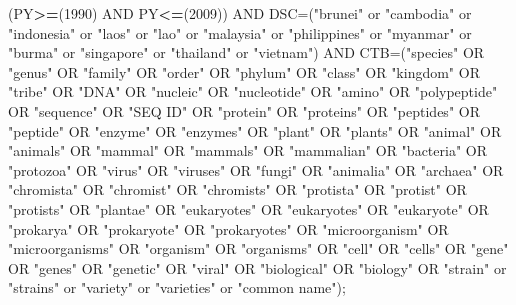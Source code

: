 \documentclass[]{book}
\newenvironment{Shaded}{\begin{snugshade}}{\end{snugshade}}
\newcommand{\DecValTok}[1]{\textcolor[rgb]{0.00,0.00,0.81}{#1}}
\newcommand{\NormalTok}[1]{#1}
\newcommand{\OperatorTok}[1]{\textcolor[rgb]{0.81,0.36,0.00}{\textbf{#1}}}
\newcommand{\StringTok}[1]{\textcolor[rgb]{0.31,0.60,0.02}{#1}}
\theoremstyle{definition}
\theoremstyle{definition}
\theoremstyle{definition}
\theoremstyle{remark}
\begin{document}
\begin{Shaded}
\begin{Highlighting}[]
\NormalTok{(PY}\OperatorTok{>=}\NormalTok{(}\DecValTok{1990}\NormalTok{) AND PY}\OperatorTok{<=}\NormalTok{(}\DecValTok{2009}\NormalTok{)) AND DSC=(}\StringTok{"brunei"}\NormalTok{ or }\StringTok{"cambodia"}\NormalTok{ or }\StringTok{"indonesia"}\NormalTok{ or }\StringTok{"laos"}\NormalTok{ or }\StringTok{"lao"}\NormalTok{ or }\StringTok{"malaysia"}\NormalTok{ or }\StringTok{"philippines"}\NormalTok{ or }\StringTok{"myanmar"}\NormalTok{ or }\StringTok{"burma"}\NormalTok{ or }\StringTok{"singapore"}\NormalTok{ or }\StringTok{"thailand"}\NormalTok{ or }\StringTok{"vietnam"}\NormalTok{) AND CTB=(}\StringTok{"species"}\NormalTok{ OR }\StringTok{"genus"}\NormalTok{ OR }\StringTok{"family"}\NormalTok{ OR }\StringTok{"order"}\NormalTok{ OR }\StringTok{"phylum"}\NormalTok{ OR }\StringTok{"class"}\NormalTok{ OR }\StringTok{"kingdom"}\NormalTok{ OR }\StringTok{"tribe"}\NormalTok{ OR }\StringTok{"DNA"}\NormalTok{ OR }\StringTok{"nucleic"}\NormalTok{ OR }\StringTok{"nucleotide"}\NormalTok{ OR }\StringTok{"amino"}\NormalTok{ OR }\StringTok{"polypeptide"}\NormalTok{ OR }\StringTok{"sequence"}\NormalTok{ OR }\StringTok{"SEQ ID"}\NormalTok{ OR }\StringTok{"protein"}\NormalTok{ OR }\StringTok{"proteins"}\NormalTok{ OR }\StringTok{"peptides"}\NormalTok{ OR }\StringTok{"peptide"}\NormalTok{ OR }\StringTok{"enzyme"}\NormalTok{ OR }\StringTok{"enzymes"}\NormalTok{ OR }\StringTok{"plant"}\NormalTok{ OR }\StringTok{"plants"}\NormalTok{ OR }\StringTok{"animal"}\NormalTok{ OR }\StringTok{"animals"}\NormalTok{ OR }\StringTok{"mammal"}\NormalTok{ OR }\StringTok{"mammals"}\NormalTok{ OR }\StringTok{"mammalian"}\NormalTok{ OR }\StringTok{"bacteria"}\NormalTok{ OR }\StringTok{"protozoa"}\NormalTok{ OR }\StringTok{"virus"}\NormalTok{ OR }\StringTok{"viruses"}\NormalTok{ OR }\StringTok{"fungi"}\NormalTok{ OR }\StringTok{"animalia"}\NormalTok{ OR }\StringTok{"archaea"}\NormalTok{ OR }\StringTok{"chromista"}\NormalTok{ OR }\StringTok{"chromist"}\NormalTok{ OR }\StringTok{"chromists"}\NormalTok{ OR }\StringTok{"protista"}\NormalTok{ OR }\StringTok{"protist"}\NormalTok{ OR }\StringTok{"protists"}\NormalTok{ OR }\StringTok{"plantae"}\NormalTok{ OR }\StringTok{"eukaryotes"}\NormalTok{ OR }\StringTok{"eukaryotes"}\NormalTok{ OR }\StringTok{"eukaryote"}\NormalTok{ OR }\StringTok{"prokarya"}\NormalTok{ OR }\StringTok{"prokaryote"}\NormalTok{ OR }\StringTok{"prokaryotes"}\NormalTok{ OR }\StringTok{"microorganism"}\NormalTok{ OR }\StringTok{"microorganisms"}\NormalTok{ OR }\StringTok{"organism"}\NormalTok{ OR }\StringTok{"organisms"}\NormalTok{ OR }\StringTok{"cell"}\NormalTok{ OR }\StringTok{"cells"}\NormalTok{ OR }\StringTok{"gene"}\NormalTok{ OR }\StringTok{"genes"}\NormalTok{ OR }\StringTok{"genetic"}\NormalTok{ OR }\StringTok{"viral"}\NormalTok{ OR }\StringTok{"biological"}\NormalTok{ OR }\StringTok{"biology"}\NormalTok{ OR }\StringTok{"strain"}\NormalTok{ or }\StringTok{"strains"}\NormalTok{ or }\StringTok{"variety"}\NormalTok{ or }\StringTok{"varieties"}\NormalTok{ or }\StringTok{"common name"}\NormalTok{);}
\end{Highlighting}
\end{Shaded}
\end{document}
